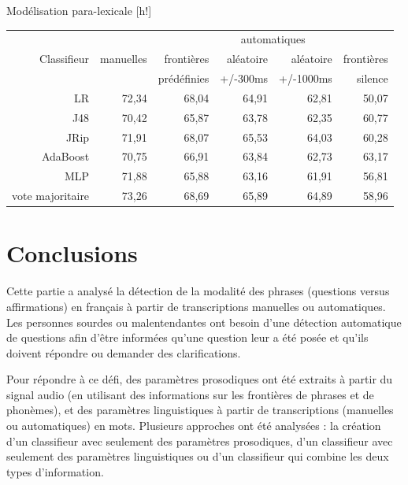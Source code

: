 \documentclass{style/these}
\makeatletter
\renewcommand\familydefault{ptm}
\renewenvironment{table}%
{ \renewcommand{\familydefault}{ptm}\selectfont
  \@float{table}}
  {\end@float}
\makeatother
\begin{document}
\begin{part}{Modélisation para-lexicale}
\begin{table}[h!]
\centering
\begin{tabular}{|r|r|r|r|r|r|} 
\hline
\multirow{3}{*}{Classifieur} 	& \multirow{3}{*}{manuelles} & \multicolumn{4}{c|}{automatiques}	\\ \cline{3-6}
				&				& frontières 	& aléatoire  		& aléatoire	& frontières	\\
				&				& prédéfinies 	& +/-300ms		& +/-1000ms	& silence	\\ \hline
LR				& 72,34				& 68,04		& 64,91			& 62,81		& 50,07		\\ 
J48				& 70,42				& 65,87 	& 63,78			& 62,35		& 60,77		\\ 
JRip				& 71,91				& 68,07		& 65,53			& 64,03		& 60,28		\\ 
AdaBoost			& 70,75				& 66,91		& 63,84			& 62,73		& 63,17		\\ 
MLP				& 71,88				& 65,88		& 63,16			& 61,91		& 56,81		\\ \hline 
vote majoritaire		& 73,26				& 68,69		& 65,89			& 64,89		& 58,96		\\ \hline
\end{tabular}
\caption{Performance (moyenne harmonique) obtenue avec les 5 classifieurs et avec leur combinaison (par vote majoritaire) sur les transcriptions manuelles et automatiques} 
\label{Tab:votemajoritaire}
\end{table}



\chapter{Conclusions}
\renewcommand{\leftmark}{Conclusions}
\renewcommand{\rightmark}{Conclusions}

Cette partie a analysé la détection de la modalité des phrases (questions versus affirmations) en français à partir de transcriptions manuelles ou automatiques. 
Les personnes sourdes ou malentendantes ont besoin d'une détection automatique de questions afin d'être informées qu'une question leur a été posée et qu'ils doivent répondre ou demander des clarifications. 

Pour répondre à ce défi, des paramètres prosodiques ont été extraits à partir du signal audio (en utilisant des informations sur les frontières de phrases et de phonèmes), et des paramètres linguistiques à partir de transcriptions (manuelles ou automatiques) en mots. 
Plusieurs approches ont été analysées : la création d'un classifieur avec seulement des paramètres prosodiques, d'un classifieur avec seulement des paramètres linguistiques ou d'un classifieur qui combine les deux types d'information.


\end{part}
\end{document}

